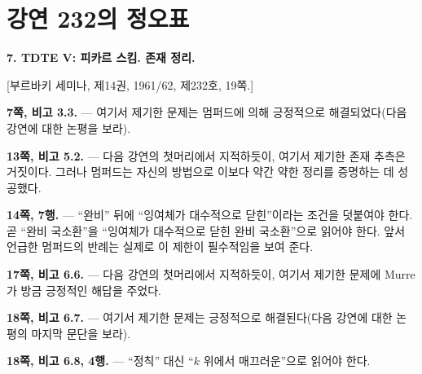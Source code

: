 \clearpage
\chapter*{강연 232의 정오표}
\setcounter{footnote}{9}

\noindent\textbf{7. TDTE V: 피카르 스킴. 존재 정리.}

\begin{center}
[부르바키 세미나, 제14권, 1961/62, 제232호, 19쪽.]
\end{center}

\noindent\textbf{7쪽, 비고 3.3.} --- 여기서 제기한 문제는 멈퍼드에
의해 긍정적으로 해결되었다(다음 강연에 대한 논평을 보라).

\noindent\textbf{13쪽, 비고 5.2.} --- 다음 강연의 첫머리에서
지적하듯이, 여기서 제기한 존재 추측은 거짓이다. 그러나 멈퍼드는 자신의
방법으로 이보다 약간 약한 정리를 증명하는 데 성공했다.

\noindent\textbf{14쪽, 7행.} --- ``완비'' 뒤에 ``잉여체가 대수적으로
닫힌''이라는 조건을 덧붙여야 한다. 곧 ``완비 국소환''을 ``잉여체가
대수적으로 닫힌 완비 국소환''으로 읽어야 한다. 앞서 언급한 멈퍼드의
반례는 실제로 이 제한이 필수적임을 보여 준다.

\noindent\textbf{17쪽, 비고 6.6.} --- 다음 강연의 첫머리에서
지적하듯이, 여기서 제기한 문제에 Murre가 방금 긍정적인 해답을 주었다.

\noindent\textbf{18쪽, 비고 6.7.} --- 여기서 제기한 문제는
긍정적으로 해결된다(다음 강연에 대한 논평의 마지막 문단을 보라).

\noindent\textbf{18쪽, 비고 6.8, 4행.} --- ``정칙'' 대신
``$k$ 위에서 매끄러운''으로 읽어야 한다.

